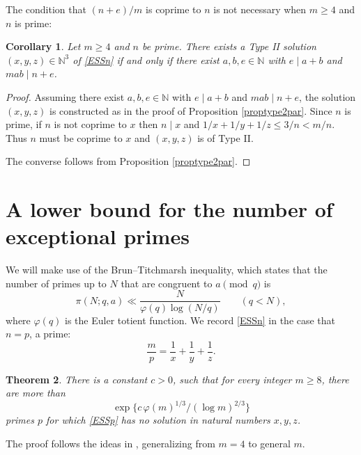 \documentclass[12pt]{amsart}
\newtheorem{theorem}{Theorem}[section]
\newtheorem{corollary}[theorem]{Corollary}
\theoremstyle{definition}
\theoremstyle{remark}
\numberwithin{equation}{section}
\begin{document}
The condition that $(n+e)/m$ is coprime to $n$ is not necessary when $m\ge 4$ and $n$ is prime:

\begin{corollary}
\label{corII}
Let $m\ge 4$ and $n$ be prime. 
There exists a Type II solution $(x,y,z)\in \mathbb{N}^3$ of \eqref{ESSn} if and only if 
there exist $a,b,e \in \mathbb{N}$ with $e\mid a+b$ and $mab\mid n+e$.
\end{corollary}

\begin{proof}
Assuming there exist $a,b,e \in \mathbb{N}$ with $e\mid a+b$ and $mab\mid n+e$, the solution $(x,y,z)$ is 
constructed as in the proof of Proposition \ref{proptype2par}. Since $n$ is prime, if $n$ is not coprime to $x$ then $n\mid x$ and
$1/x+1/y+1/z\le 3/n<m/n$. Thus $n$ must be coprime to $x$ and $(x,y,z)$ is of Type II.

The converse follows from Proposition \ref{proptype2par}.
\end{proof}


 
\section{A lower bound for the number of exceptional primes}


We will make use of the Brun--Titchmarsh inequality, which states that the number of primes up to $N$ that are congruent to $a \pmod q$ is
$$
\pi(N;q,a) \ll \frac{N}{\varphi(q) \log (N/q)} \qquad (q<N),
$$
where $\varphi(q)$ is the Euler totient function.   We record \eqref{ESSn} in the case that
$n=p$, a prime:
\begin{equation}
\label{ESSp}
\frac mp = \frac1x+\frac1y+\frac1z.
\end{equation}

\begin{theorem}
\label{th-mboundtoo}
There is a constant $c>0$, such that for every integer $m\ge 8$, there are more than 
$$
\exp\{c\, \varphi(m)^{1/3}/(\log m)^{2/3}\}
$$ 
primes $p$  
for which \eqref{ESSp} has no solution in natural numbers $x,y,z$.
\end{theorem}

The proof follows the ideas in \cite[Sections 8, 9]{ET}, generalizing from $m=4$ to general $m$. 
\end{document}
